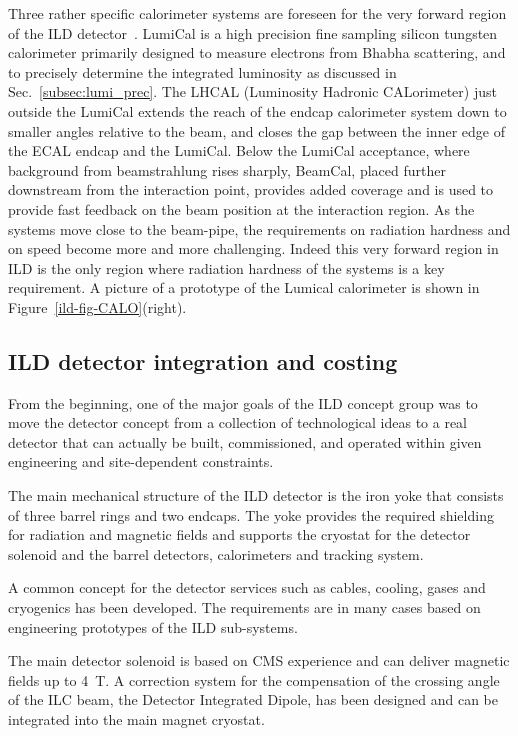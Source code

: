 Three rather specific calorimeter systems are foreseen for the very forward region of the ILD detector~\cite{Abramowicz:2010bg}. LumiCal is a high precision fine sampling silicon tungsten calorimeter primarily designed to measure electrons from Bhabha scattering, and to precisely determine the integrated luminosity as discussed in Sec.~\ref{subsec:lumi_prec}. The LHCAL (Luminosity Hadronic CALorimeter) just outside the LumiCal extends the reach of the endcap calorimeter system down to smaller angles relative to the beam, and closes the gap between the inner edge of the ECAL endcap and the LumiCal.  Below the LumiCal acceptance, where background from beamstrahlung rises sharply, BeamCal, placed further downstream from the interaction point, provides added coverage and is used to provide fast feedback on the beam position at the interaction region. As the systems move close to the beam-pipe, the requirements on radiation hardness and on speed become more and more challenging. Indeed this very forward region in ILD is the only region where radiation hardness of the systems is a key requirement. A picture of a prototype of the Lumical calorimeter is shown in Figure~\ref{ild-fig-CALO}(right).

\subsection{ILD detector integration and costing}
From the beginning, one of the major goals of the ILD concept group was  to move the detector concept from a collection of technological ideas to a real detector that can actually be built, commissioned, and operated within given engineering and site-dependent constraints. 

The main mechanical structure of the ILD detector is the iron yoke that consists of three barrel rings and two endcaps. The yoke provides the required shielding for radiation and magnetic fields and supports the cryostat for the detector solenoid and the barrel detectors, calorimeters and tracking system. 

A common concept for the detector services such as cables, cooling, gases and cryogenics has been developed. The requirements are in many cases based on engineering prototypes of the ILD sub-systems. 

The main detector solenoid is based on CMS experience and can deliver magnetic fields up to 4~T. A correction system for the compensation of the crossing angle of the ILC beam, the Detector Integrated Dipole, has been designed and can be integrated into the main magnet cryostat.

